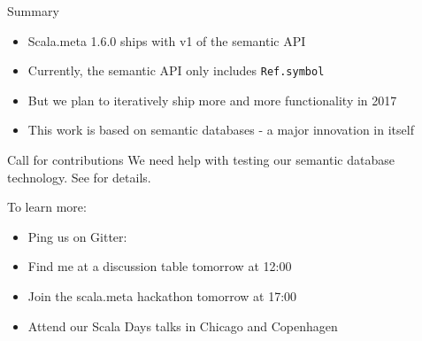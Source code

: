 \documentclass[svgnames,dvipsnames,hyperref={bookmarks=false},usepdftitle=false]{beamer}
\begin{document}

\begin{frame}{Summary}
\begin{itemize}
\item Scala.meta 1.6.0 ships with v1 of the semantic API
\item Currently, the semantic API only includes \texttt{Ref.symbol}
\item But we plan to iteratively ship more and more functionality in 2017
\item This work is based on semantic databases - a major innovation in itself
\end{itemize}
\end{frame}

\begin{frame}{Call for contributions}
We need help with testing our semantic database technology.
See 
for details.

\vskip15pt
To learn more:
\begin{itemize}
\item Ping us on Gitter: 
\item Find me at a discussion table tomorrow at 12:00
\item Join the scala.meta hackathon tomorrow at 17:00
\item Attend our Scala Days talks in Chicago and Copenhagen
\end{itemize}
\end{frame}

\end{document}
